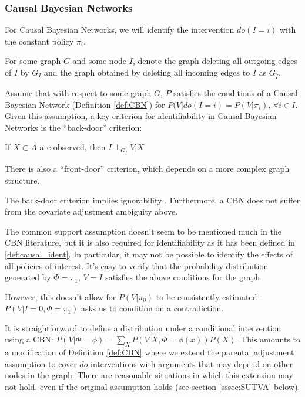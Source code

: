 \subsubsection{Causal Bayesian Networks}

For Causal Bayesian Networks, we will identify the intervention $do(I=i)$ with the constant policy $\pi_i$.

For some graph $G$ and some node $I$, denote the graph deleting all outgoing edges of $I$ by $G_{\underline{I}}$ and the graph obtained by deleting all incoming edges to $I$ as $G_{\overline{I}}$.

Assume that with respect to some graph $G$, $P$ satisfies the conditions of a Causal Bayesian Network (Definition \ref{def:CBN}) for $P(V|do(I=i)=P(V|\pi_i)$, $\forall i\in I$. Given this assumption, a key criterion for identifiability in Causal Bayesian Networks is the ``back-door'' criterion:

If $X\subset A$ are observed, then $I\perp_{G_{\underline{I}}} V|X$

There is also a ``front-door'' criterion, which depends on a more complex graph structure.

The back-door criterion implies ignorability \cite{pearl_causality:_2009}. Furthermore, a CBN does not suffer from the covariate adjustment ambiguity above.

The common support assumption doesn't seem to be mentioned much in the CBN literature, but it is also required for identifiability as it has been defined in \ref{def:causal_ident}. In particular, it may not be possible to identify the effects of all policies of interest. It's easy to verify that the probability distribution generated by $\Phi=\pi_1$, $V=I$ satisfies the above conditions for the graph

\begin{center}
\end{center}

However, this doesn't allow for $P(V|\pi_0)$ to be consistently estimated - $P(V|I=0,\Phi=\pi_1)$ asks us to condition on a contradiction.

It is straightforward to define a distribution under a conditional intervention using a CBN: $P(V|\Phi=\phi)=\sum_X P(V|X,\Phi=\phi(x)) P(X)$. This amounts to a modification of Definition \ref{def:CBN} where we extend the parental adjustment assumption to cover $do$ interventions with arguments that may depend on other nodes in the graph. There are reasonable situations in which this extension may not hold, even if the original assumption holds (see section \ref{sssec:SUTVA} below).

